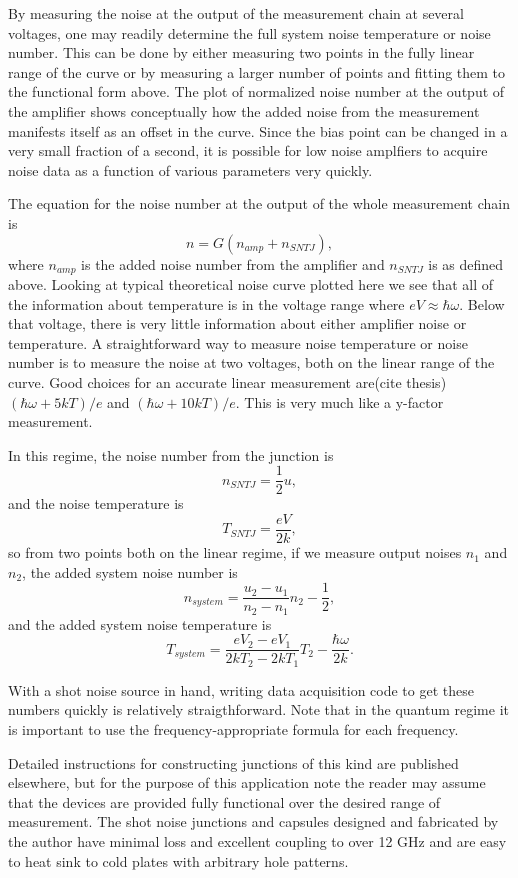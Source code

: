\documentclass{report}
\begin{document}
By measuring the noise at the output of the measurement chain at several voltages, one may readily determine the full system noise temperature or noise number.  This can be done by either measuring two points in the fully linear range of the curve or by measuring a larger number of points and fitting them to the functional form above.  The plot of normalized noise number at the output of the amplifier shows conceptually how the added noise from the measurement manifests itself as an offset in the curve.  Since the bias point can be changed in a very small fraction of a second, it is possible for low noise amplfiers to acquire noise data as a function of various parameters very quickly.  

The equation for the noise number at the output of the whole measurement chain is
\begin{equation}
n = G(n_{amp} + n_{SNTJ}),
\end{equation}
where $n_{amp}$ is the added noise number from the amplifier and $n_{SNTJ}$ is as defined above.  Looking at typical theoretical noise curve plotted here we see that all of the information about temperature is in the voltage range where $eV\approx\hbar\omega$.  Below that voltage, there is very little information about either amplifier noise or temperature.  A straightforward way to measure noise temperature or noise number is to measure the noise at two voltages, both on the linear range of the curve.  Good choices for an accurate linear measurement are(cite thesis) $(\hbar\omega + 5 kT)/e$ and $(\hbar\omega + 10 kT)/e$.  This is very much like a y-factor measurement.  

	In this regime, the noise number from the junction is 
\begin{equation}
n_{SNTJ} =  \frac{1}{2}u,
\end{equation}
and the noise temperature is 
\begin{equation}
T_{SNTJ} = \frac{eV}{2k},
\end{equation}
so from two points both on the linear regime, if we measure output noises $n_1$ and$n_2$, the added system noise number is 
\begin{equation}
n_{system} = \frac{u_2 -  u_1}{n_2 - n_1}n_2 - \frac{1}{2},
\end{equation}
and the added system noise temperature is 
\begin{equation}
T_{system} = \frac{eV_2 - eV_1}{2kT_2 - 2kT_1}T_2 - \frac{\hbar\omega}{2k}.
\end{equation}

	With a shot noise source in hand, writing data acquisition code to get these numbers quickly is relatively straigthforward.  Note that in the quantum regime it is important to use the frequency-appropriate formula for each frequency.  
	
	Detailed instructions for constructing junctions of this kind are published elsewhere, but for the purpose of this application note the reader may assume that the devices are provided fully functional over the desired range of measurement.  The shot noise junctions and capsules designed and fabricated by the author have minimal loss and excellent coupling to over 12 GHz and are easy to heat sink to cold plates with arbitrary hole patterns.
\end{document}
